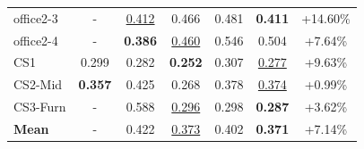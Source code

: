 \begin{table}[t!]
{\begin{tabular}{l|ccccc|c}
            office2-3 & -     & \underline{0.412} & 0.466 & 0.481 & \textbf{0.411} & {+14.60\%} \\
            office2-4 & -     & \textbf{0.386} & \underline{0.460} & 0.546 & 0.504 & {+7.64\%} \\
        \midrule
            CS1       & 0.299 & 0.282 & \textbf{0.252} & 0.307 & \underline{0.277} & {+9.63\%} \\
        \midrule
            CS2-Mid & \textbf{0.357} & 0.425 & 0.268 & 0.378 & \underline{0.374} & {+0.99\%} \\
        \midrule
            CS3-Furn  & -     & 0.588 & \underline{0.296} & 0.298 & \textbf{0.287} & {+3.62\%} \\
        \midrule
             \textbf{Mean} & - & 0.422 & \underline{0.373} & 0.402 & \textbf{0.371} & \multicolumn{1}{c}{{+7.14\%}} \\
        \bottomrule
    \end{tabular}
    }
    \label{tbl_RMSE}
\end{table}